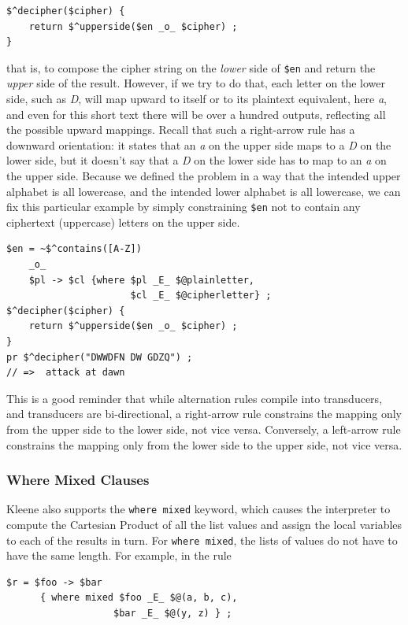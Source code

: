\begin{Verbatim}
$^decipher($cipher) {
    return $^upperside($en _o_ $cipher) ;
}
\end{Verbatim}

\noindent
that is, to compose the cipher string on the \emph{lower} side of \verb!$en! and return the \emph{upper} side of the
result.  However, if we try to do that, each letter on the lower side, such as \emph{D}, will map upward to itself or to its
plaintext equivalent, here \emph{a}, and even for this short text there will be over a hundred outputs, reflecting all the
possible upward mappings.  Recall that such
a right-arrow rule has a downward orientation:  it states that an \emph{a} on the upper side maps to a \emph{D} on the
lower side, but it doesn't say that a \emph{D} on the lower side has to map to an \emph{a} on the upper side.  Because we
defined the problem in a way that the intended upper alphabet is all lowercase, and the intended lower alphabet is all
lowercase, we can fix
this particular example by simply constraining \verb!$en! not to contain any ciphertext (uppercase) letters on the upper side.

\begin{Verbatim}
$en = ~$^contains([A-Z])
	_o_
	$pl -> $cl {where $pl _E_ $@plainletter,
                      $cl _E_ $@cipherletter} ;
$^decipher($cipher) {
    return $^upperside($en _o_ $cipher) ;
}
pr $^decipher("DWWDFN DW GDZQ") ;
// =>  attack at dawn
\end{Verbatim}

\noindent
This is a good reminder that while alternation rules compile into transducers, and transducers are bi-directional, a
right-arrow rule constrains the mapping only from the upper side to the
lower side, not vice versa.  Conversely, a left-arrow rule constrains
the mapping only from the lower side to the upper side, not vice versa.


\subsubsection{Where Mixed Clauses}

Kleene also supports the \texttt{where mixed} keyword, which causes the
interpreter to compute the Cartesian Product of all the list values and
assign the local variables to each of the results in turn.  For
\texttt{where mixed}, the lists of values do not have to have the same
length.  For example, in the rule

\begin{Verbatim}
$r = $foo -> $bar 
      { where mixed $foo _E_ $@(a, b, c), 
	               $bar _E_ $@(y, z) } ;
\end{Verbatim}

